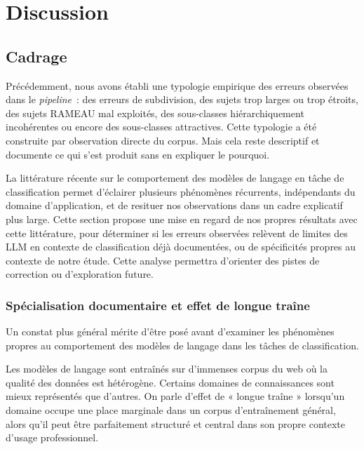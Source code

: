 \section{Discussion}
\label{sec:discussion-litterature}

\subsection{Cadrage}
Précédemment, nous avons établi une typologie empirique des erreurs observées dans le \textit{pipeline}~: des erreurs de subdivision, des sujets trop larges ou trop étroits, des sujets RAMEAU mal exploités, des sous-classes hiérarchiquement incohérentes ou encore des sous-classes attractives. Cette typologie a été construite par observation directe du corpus. Mais cela reste descriptif et documente ce qui s'est produit sans en expliquer le pourquoi.

La littérature récente sur le comportement des modèles de langage en tâche de classification permet d'éclairer plusieurs phénomènes récurrents, indépendants du domaine d'application, et de resituer nos observations dans un cadre explicatif plus large. Cette section propose une mise en regard de nos propres résultats avec cette littérature, pour déterminer si les erreurs observées relèvent de limites des LLM en contexte de classification déjà documentées, ou de spécificités propres au contexte de notre étude. Cette analyse permettra d'orienter des pistes de correction ou d'exploration future.









\subsubsection*{Spécialisation documentaire et effet de longue traîne}

Un constat plus général mérite d'être posé avant d'examiner les phénomènes propres au comportement des modèles de langage dans les tâches de classification.

Les modèles de langage sont entraînés sur d'immenses corpus du web où la qualité des données est hétérogène. Certains domaines de connaissances sont mieux représentés que d'autres. On parle d'effet de « longue traîne » lorsqu'un domaine occupe une place marginale dans un corpus d'entraînement général, alors qu'il peut être parfaitement structuré et central dans son propre contexte d'usage professionnel.

